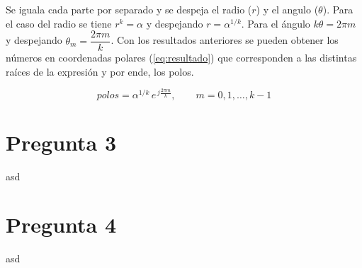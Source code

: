 \documentclass[conference]{IEEEtran}
\begin{document}
Se iguala cada parte por separado y se despeja el radio ($r$) y el angulo ($\theta$). Para el caso del radio 
se tiene $r^k = \alpha$ y despejando $r = \alpha^{1/k}$. Para el ángulo $k\theta = 2\pi m$ y despejando 
$\theta_m = \dfrac{2\pi m}{k}$. Con los resultados anteriores se pueden obtener los números en coordenadas 
polares (\ref{eq:resultado}) que corresponden a las distintas raíces de la expresión y por ende, los polos. 

\begin{equation}
polos = \alpha^{1/k}\, e^{\,j\frac{2\pi m}{k}}, \qquad m = 0, 1, \dots, k-1
\label{eq:resultado}
\end{equation}



\section{Pregunta 3}
asd




\section{Pregunta 4}
asd
\end{document}
